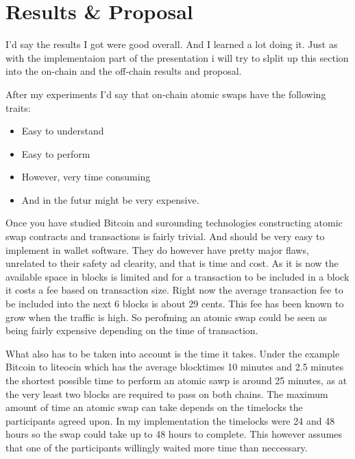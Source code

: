 \chapter{Results \& Proposal}
I'd say the results I got were good overall. And I learned a lot doing it. Just as with
the implementaion part of the presentation i will try to slplit up this section into 
the on-chain and the off-chain results and proposal.

After my experiments I'd say that on-chain atomic swaps have the following traits:
\begin{itemize}
\item Easy to understand
\item Easy to perform
\item However, very time consuming
\item And in the futur might be very expensive.
\end{itemize}

Once you have studied Bitcoin and surounding technologies constructing atomic 
swap contracts and transactions is fairly trivial. And should be very easy to 
implement in wallet software. They do however have pretty major flaws, 
unrelated to their safety ad clearity, and that is time and cost.
As it is now the available space in blocks is limited and for a transaction 
to be included in a block it costs a fee based on transaction size. Right now 
the average transaction fee to be included into the next 6 blocks is about 29 
cents. This fee has been known to grow when the traffic is high. So perofming 
an atomic swap could be seen as being fairly expensive depending on the time 
of transaction. 

What also has to be taken into account is the time it takes. Under the example 
Bitcoin to liteocin which has the average blocktimes 10 minutes and 2.5 minutes 
the shortest possible time to perform an atomic sawp is around 25 minutes, as 
at the very least two blocks are required to pass on both chains. The maximum 
amount of time an atomic swap can take depends on the timelocks the participants 
agreed upon. In my implementation the timelocks were 24 and 48 hours so the 
swap could take up to 48 hours to complete. This however assumes that one of 
the participants willingly waited more time than neccessary. 

